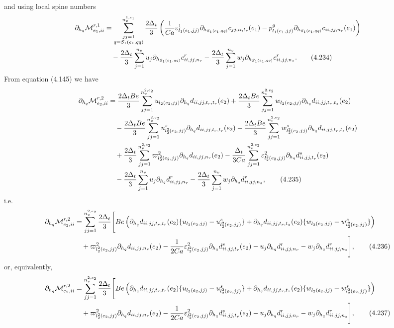 \documentclass{article}
\begin{document}
and using local spine numbers
\begin{align}
\partial_{h_q}\mathcal{M}_{e_1,ii}^{r,1} &= \sum_{\substack{jj=1\\ q=S_1(e_1,qq)}}^{n_v^{1,e_1}} \frac{2\Delta_t}{3} \left( \frac{1}{Ca} \varepsilon_{l_1(e_1,jj)}^1 \partial_{h_{S_1(e_1,qq)}} c_{jj,ii,t_r}(e_1) - p_{l_1(e_1,jj)}^g \partial_{h_{S_1(e_1,qq)}} c_{ii,jj,n_r}(e_1) \right) \nonumber\\
&\quad - \frac{2\Delta_t}{3} \sum_{j=1}^{n_v} u_j \partial_{h_{S_1(e_1,qq)}} c_{ii,jj,n_r}^r 
- \frac{2\Delta_t}{3} \sum_{j=1}^{n_v} w_j \partial_{h_{S_1(e_1,qq)}} c_{ii,jj,n_z}^r. \tag{4.234}
\end{align}
From equation (4.145) we have
\begin{align}
\partial_{h_q}\mathcal{M}_{e_2,ii}^{r,2} &= \frac{2\Delta_t Be}{3} \sum_{jj=1}^{n_v^{2,e_2}} u_{l_2(e_2,jj)} \partial_{h_q} d_{ii,jj,t_r,t_r}(e_2) 
+ \frac{2\Delta_t Be}{3} \sum_{jj=1}^{n_v^{2,e_2}} w_{l_2(e_2,jj)} \partial_{h_q} d_{ii,jj,t_r,t_z}(e_2) \nonumber\\
&\quad - \frac{2\Delta_t Be}{3} \sum_{jj=1}^{n_v^{2,e_2}} u_{l_2^2(e_2,jj)}^s \partial_{h_q} d_{ii,jj,t_r,t_r}(e_2) 
- \frac{2\Delta_t Be}{3} \sum_{jj=1}^{n_v^{2,e_2}} w_{l_2^2(e_2,jj)}^s \partial_{h_q} d_{ii,jj,t_r,t_z}(e_2) \nonumber\\
&\quad + \frac{2\Delta_t}{3} \sum_{jj=1}^{n_v^{2,e_2}} \varpi_{l_2^2(e_2,jj)}^2 \partial_{h_q} d_{ii,jj,n_r}(e_2) 
- \frac{\Delta_t}{3Ca} \sum_{jj=1}^{n_v^{2,e_2}} \varepsilon_{l_2^2(e_2,jj)}^2 \partial_{h_q} d_{ii,jj,t_r}^s(e_2) \nonumber\\
&\quad - \frac{2\Delta_t}{3} \sum_{j=1}^{n_v} u_j \partial_{h_q} d_{ii,jj,n_r}^r 
- \frac{2\Delta_t}{3} \sum_{j=1}^{n_v} w_j \partial_{h_q} d_{ii,jj,n_z}^r, \tag{4.235}
\end{align}
i.e.
\begin{align}
\partial_{h_q}\mathcal{M}_{e_2,ii}^{r,2} &= \sum_{jj=1}^{n_v^{2,e_2}} \frac{2\Delta_t}{3} \Bigg[ Be \left( \partial_{h_q} d_{ii,jj,t_r,t_r}(e_2) \{ u_{l_2(e_2,jj)} - u_{l_2^2(e_2,jj)}^s \} 
+ \partial_{h_q} d_{ii,jj,t_r,t_z}(e_2) \{ w_{l_2(e_2,jj)} - w_{l_2^2(e_2,jj)}^s \} \right) \nonumber\\
&\quad + \varpi_{l_2^2(e_2,jj)}^2 \partial_{h_q} d_{ii,jj,n_r}(e_2) 
- \frac{1}{2Ca} \varepsilon_{l_2^2(e_2,jj)}^2 \partial_{h_q} d_{ii,jj,t_r}^s(e_2) 
- u_j \partial_{h_q} d_{ii,jj,n_r}^r 
- w_j \partial_{h_q} d_{ii,jj,n_z}^r \Bigg], \tag{4.236}
\end{align}
or, equivalently,
\begin{align}
\partial_{h_q}\mathcal{M}_{e_2,ii}^{r,2} &= \sum_{jj=1}^{n_v^{2,e_2}} \frac{2\Delta_t}{3} \Bigg[ Be \left( \partial_{h_q} d_{ii,jj,t_r,t_r}(e_2) \{ u_{l_2(e_2,jj)} - u_{l_2^2(e_2,jj)}^s \} 
+ \partial_{h_q} d_{ii,jj,t_r,t_z}(e_2) \{ w_{l_2(e_2,jj)} - w_{l_2^2(e_2,jj)}^s \} \right) \nonumber\\
&\quad + \varpi_{l_2^2(e_2,jj)}^2 \partial_{h_q} d_{ii,jj,n_r}(e_2) 
- \frac{1}{2Ca} \varepsilon_{l_2^2(e_2,jj)}^2 \partial_{h_q} d_{ii,jj,t_r}^s(e_2) 
- u_j \partial_{h_q} d_{ii,jj,n_r}^r 
- w_j \partial_{h_q} d_{ii,jj,n_z}^r \Bigg], \tag{4.237}
\end{align}
\end{document}
